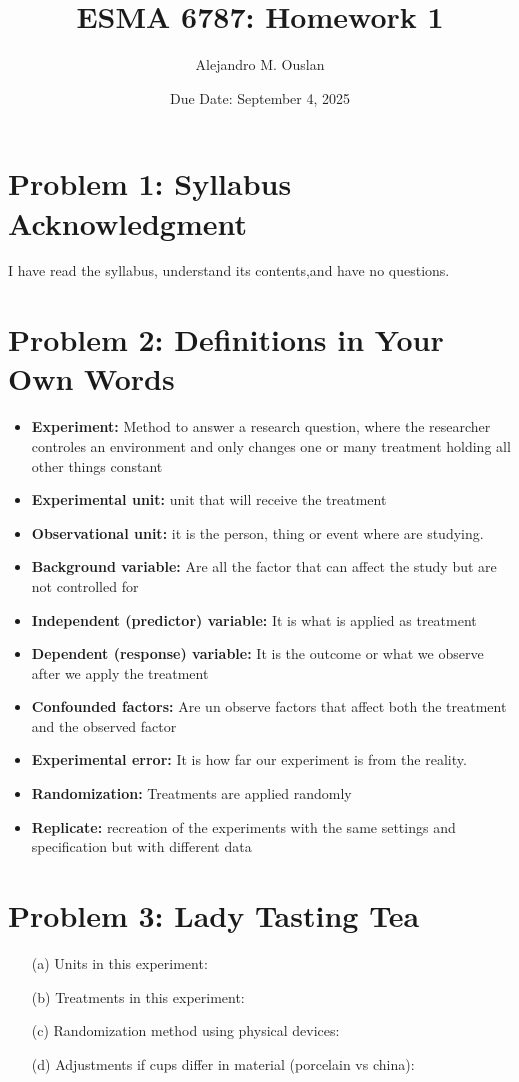 \documentclass[10pt, oneside]{article}
\title{ESMA 6787: Homework 1}
\author{Alejandro M. Ouslan}
\date{Due Date: September 4, 2025}
\begin{document}
\maketitle

\vspace{.25in}

\section*{Problem 1: Syllabus Acknowledgment}
I have read the syllabus, understand its contents,and have no questions.


\section*{Problem 2: Definitions in Your Own Words}
\begin{itemize}
	\item \textbf{Experiment:} Method to answer a research question, where the researcher controles an 
    environment and only changes one or many treatment holding all other things constant
	\item \textbf{Experimental unit:} unit that will receive the treatment
	\item \textbf{Observational unit:}  it is the person, thing or event where are studying. 
	\item \textbf{Background variable:} Are all the factor that can affect the study but are not controlled for 
	\item \textbf{Independent (predictor) variable:} It is what is applied as treatment
	\item \textbf{Dependent (response) variable:} It is the outcome or what we observe after we apply the treatment
	\item \textbf{Confounded factors:} Are un observe factors that affect both the treatment and the observed factor
	\item \textbf{Experimental error:} It is how far our experiment is from the reality.
	\item \textbf{Randomization:} Treatments are applied randomly
	\item \textbf{Replicate:} recreation of the experiments with the same settings and specification but with different data 
\end{itemize}

\section*{Problem 3: Lady Tasting Tea}
\begin{itemize}
	\item[(a)] Units in this experiment:
	\item[(b)] Treatments in this experiment:
	\item[(c)] Randomization method using physical devices:
	\item[(d)] Adjustments if cups differ in material (porcelain vs china):
\end{itemize}
\end{document}

